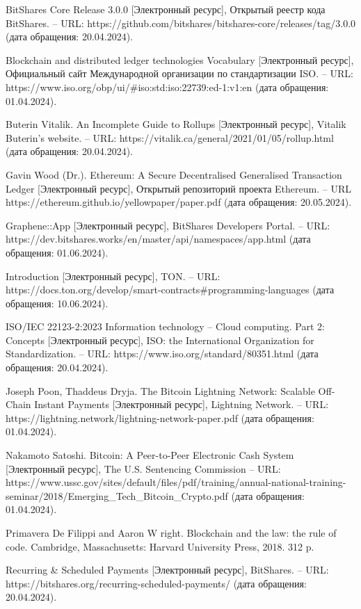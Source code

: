 \begin{thebibliography}{00}
 BitShares Core Release 3.0.0 [Электронный ресурс], Открытый реестр кода BitShares. -- URL: https://github.com/bitshares/bitshares-core/releases/tag/3.0.0 (дата обращения: 20.04.2024).

 Blockchain and distributed ledger technologies Vocabulary [Электронный ресурс], Официальный сайт Международной организации по стандартизации ISO. -- URL: https://www.iso.org/obp/ui/\#iso:std:iso:22739:ed-1:v1:en (дата обращения: 01.04.2024).

 Buterin Vitalik. An Incomplete Guide to Rollups [Электронный ресурс], Vitalik Buterin's website. -- URL:  https://vitalik.ca/general/2021/01/05/rollup.html (дата обращения: 20.04.2024).

 Gavin Wood (Dr.). Ethereum: A Secure Decentralised Generalised Transaction Ledger [Электронный ресурс], Открытый репозиторий проекта Ethereum. -- URL  https://ethereum.github.io/yellowpaper/paper.pdf (дата обращения: 20.05.2024).

 Graphene::App [Электронный ресурс], BitShares Developers Portal. -- URL: https://dev.bitshares.works/en/master/api/namespaces/app.html (дата обращения: 01.06.2024).

 Introduction [Электронный ресурс], TON. -- URL: https://docs.ton.org/develop/smart-contracts\#programming-languages (дата обращения: 10.06.2024).

 ISO/IEC 22123-2:2023 Information technology -- Cloud computing. Part 2: Concepts [Электронный ресурс], ISO: the International Organization for Standardization. -- URL: https://www.iso.org/standard/80351.html (дата обращения: 20.04.2024).

 Joseph Poon, Thaddeus Dryja. The Bitcoin Lightning Network: Scalable Off-Chain Instant Payments [Электронный ресурс], Lightning Network. -- URL: https://lightning.network/lightning-network-paper.pdf (дата обращения: 01.04.2024).

 Nakamoto Satoshi. Bitcoin: A Peer-to-Peer Electronic Cash System [Электронный ресурс], The U.S. Sentencing Commission --  URL: https://www.ussc.gov/sites/default/files/pdf/training/annual-national-training-seminar/2018/Emerging\_Tech\_Bitcoin\_Crypto.pdf (дата обращения: 01.04.2024).

 Primavera De Filippi and Aaron W right. Blockchain and the law: the rule of code. Cambridge, Massachusetts: Harvard University Press, 2018. 312 p.

 Recurring \& Scheduled Payments [Электронный ресурс], BitShares. -- URL: https://bitshares.org/recurring-scheduled-payments/ (дата обращения: 20.04.2024).

\end{thebibliography}